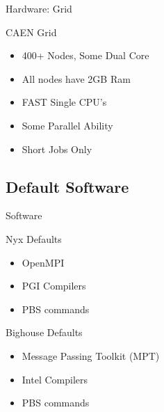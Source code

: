\documentclass{beamer}
\begin{document}
\begin{frame}{Hardware: Grid}
 \begin{block}{CAEN Grid}
  \begin{itemize}
   \item 400+ Nodes, Some Dual Core
   \item All nodes have 2GB Ram
   \item FAST Single CPU's
   \item Some Parallel Ability
   \item Short Jobs Only
  \end{itemize}
 \end{block}
\end{frame}
  
  \subsection {Default Software}
  \begin{frame}{Software}
    \begin{block}{Nyx Defaults}
    \begin{itemize}
      \item OpenMPI
      \item PGI Compilers
      \item PBS commands
    \end{itemize}
    \end{block}
    \begin{block}{Bighouse Defaults}
    \begin{itemize}
      \item Message Passing Toolkit (MPT)
      \item Intel Compilers
      \item PBS commands
    \end{itemize}
    \end{block}
  \end{frame}
\end{document}
